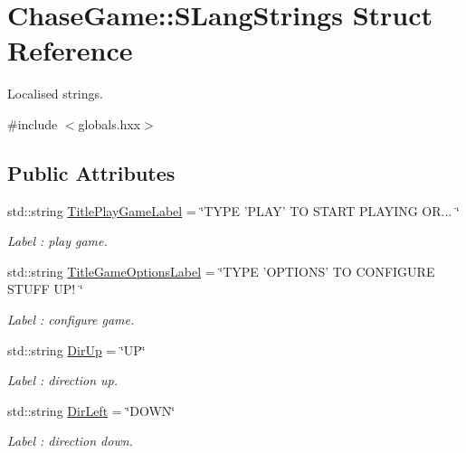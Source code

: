 \hypertarget{struct_chase_game_1_1_s_lang_strings}{\section{Chase\-Game\-:\-:S\-Lang\-Strings Struct Reference}
\label{struct_chase_game_1_1_s_lang_strings}
}


Localised strings.  




{\ttfamily \#include $<$globals.\-hxx$>$}

\subsection*{Public Attributes}
\begin{DoxyCompactItemize}
\item 
std\-::string \hyperlink{struct_chase_game_1_1_s_lang_strings_a2c84435e4b127789447a00398ac5c2b1}{Title\-Play\-Game\-Label} = \char`\"{}T\-Y\-P\-E 'P\-L\-A\-Y' T\-O S\-T\-A\-R\-T P\-L\-A\-Y\-I\-N\-G O\-R... \char`\"{}
\begin{DoxyCompactList}\small\item\em Label \-: play game. \end{DoxyCompactList}\item 
std\-::string \hyperlink{struct_chase_game_1_1_s_lang_strings_acf93994343367490b65893186e3d37eb}{Title\-Game\-Options\-Label} = \char`\"{}T\-Y\-P\-E 'O\-P\-T\-I\-O\-N\-S' T\-O C\-O\-N\-F\-I\-G\-U\-R\-E S\-T\-U\-F\-F U\-P! \char`\"{}
\begin{DoxyCompactList}\small\item\em Label \-: configure game. \end{DoxyCompactList}\item 
std\-::string \hyperlink{struct_chase_game_1_1_s_lang_strings_adf4565dfe8e7ea901505441091d06b0c}{Dir\-Up} = \char`\"{}U\-P\char`\"{}
\begin{DoxyCompactList}\small\item\em Label \-: direction up. \end{DoxyCompactList}\item 
std\-::string \hyperlink{struct_chase_game_1_1_s_lang_strings_a4ca93fbfa4edbcc41c95bd1063e6e334}{Dir\-Left} = \char`\"{}D\-O\-W\-N\char`\"{}
\begin{DoxyCompactList}\small\item\em Label \-: direction down. \end{DoxyCompactList}\item 

\end{DoxyCompactItemize}

